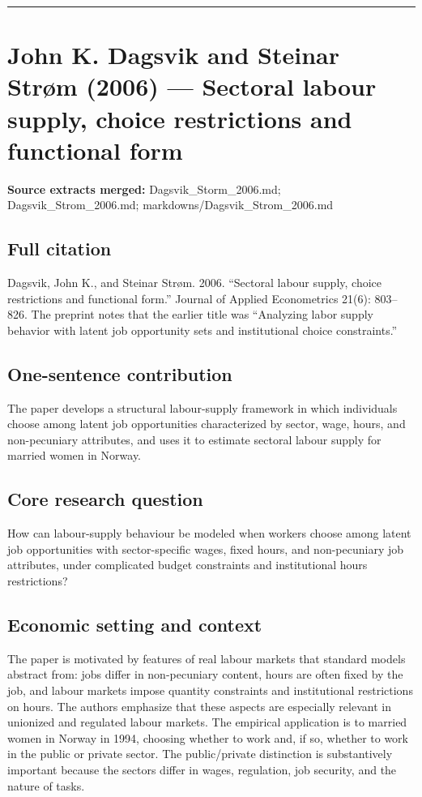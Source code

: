 \documentclass[11pt,a4paper]{article}
\begin{document}
\medskip\hrule\medskip

\section*{John K. Dagsvik and Steinar Strøm (2006) — Sectoral labour supply, choice restrictions and functional form}

\textbf{Source extracts merged:} Dagsvik\_Storm\_2006.md; Dagsvik\_Strom\_2006.md; markdowns/Dagsvik\_Strom\_2006.md

\subsection*{Full citation}
Dagsvik, John K., and Steinar Strøm. 2006. “Sectoral labour supply, choice restrictions and functional form.” Journal of Applied Econometrics 21(6): 803–826. The preprint notes that the earlier title was “Analyzing labor supply behavior with latent job opportunity sets and institutional choice constraints.”

\subsection*{One-sentence contribution}
The paper develops a structural labour-supply framework in which individuals choose among latent job opportunities characterized by sector, wage, hours, and non-pecuniary attributes, and uses it to estimate sectoral labour supply for married women in Norway.

\subsection*{Core research question}
How can labour-supply behaviour be modeled when workers choose among latent job opportunities with sector-specific wages, fixed hours, and non-pecuniary job attributes, under complicated budget constraints and institutional hours restrictions?

\subsection*{Economic setting and context}
The paper is motivated by features of real labour markets that standard models abstract from: jobs differ in non-pecuniary content, hours are often fixed by the job, and labour markets impose quantity constraints and institutional restrictions on hours. The authors emphasize that these aspects are especially relevant in unionized and regulated labour markets. The empirical application is to married women in Norway in 1994, choosing whether to work and, if so, whether to work in the public or private sector. The public/private distinction is substantively important because the sectors differ in wages, regulation, job security, and the nature of tasks.
\end{document}
